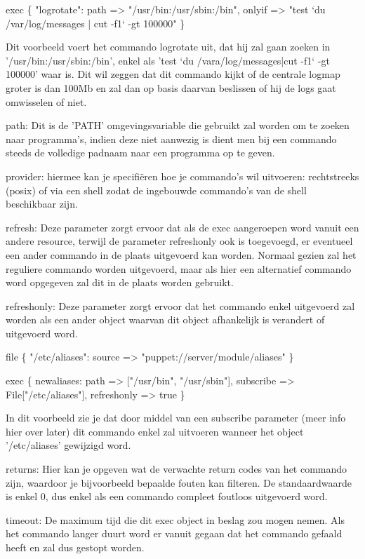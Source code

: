 			exec \{ "logrotate":
				path => "/usr/bin:/usr/sbin:/bin",
				onlyif => "test `du /var/log/messages | cut -f1` -gt 100000"
			\}

		Dit voorbeeld voert het commando logrotate uit, dat hij zal gaan zoeken in '/usr/bin:/usr/sbin:/bin', enkel als 'test `du /vara/log/messages|cut -f1` -gt 100000' waar is.
		Dit wil zeggen dat dit commando kijkt of de centrale logmap groter is dan 100Mb en zal dan op basis daarvan beslissen of hij de logs gaat omwisselen of niet.

		path:
		Dit is de 'PATH' omgevingsvariable die gebruikt zal worden om te zoeken naar programma's, indien deze niet aanwezig is dient men bij een commando steeds de volledige padnaam naar een programma op te geven.

		provider:
		hiermee kan je specifiëren hoe je commando's wil uitvoeren: rechtstreeks (posix) of via een shell zodat de ingebouwde commando's van de shell beschikbaar zijn.

		refresh:
		Deze parameter zorgt ervoor dat als de exec aangeroepen word vanuit een andere resource, terwijl de parameter refreshonly ook is toegevoegd, er eventueel een ander commando in de plaats uitgevoerd kan worden.
		Normaal gezien zal het reguliere commando worden uitgevoerd, maar als hier een alternatief commando word opgegeven zal dit in de plaats worden gebruikt.

		refreshonly:
		Deze parameter zorgt ervoor dat het commando enkel uitgevoerd zal worden als een ander object waarvan dit object afhankelijk is verandert of uitgevoerd word.

			file \{ "/etc/aliases":
				source => "puppet://server/module/aliases"
			\}

			exec \{ newaliases:
				path => ["/usr/bin", "/usr/sbin"],
				subscribe => File["/etc/aliases"],
				refreshonly => true
			\}

		In dit voorbeeld zie je dat door middel van een subscribe parameter (meer info hier over later) dit commando enkel zal uitvoeren wanneer het object '/etc/aliases' gewijzigd word.

		returns:
		Hier kan je opgeven wat de verwachte return codes van het commando zijn, waardoor je bijvoorbeeld bepaalde fouten kan filteren.
		De standaardwaarde is enkel 0, dus enkel als een commando compleet foutloos uitgevoerd word.

		timeout:
		De maximum tijd die dit exec object in beslag zou mogen nemen.
		Als het commando langer duurt word er vanuit gegaan dat het commando gefaald heeft en zal dus gestopt worden.

